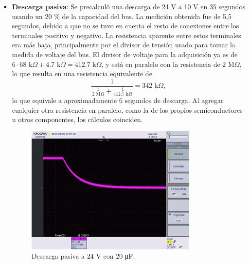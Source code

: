 \begin{itemize}
	\item \textbf{Descarga pasiva}: Se precalculó una descarga de 24 V a 10 V en 35 segundos usando un 20 \% de la capacidad del bus. La medición obtenida fue de 5,5 segundos, debido a que no se tuvo en cuenta el resto de conexiones entre los terminales positivo y negativo. La resistencia aparente entre estos terminales era más baja, principalmente por el divisor de tensión usado para tomar la medida de voltaje del bus. El divisor de voltaje para la adquisición ya es de $6 \cdot 68 \text{ k}\Omega + 4.7 \text{ k}\Omega = 412.7 \text{ k}\Omega$, y está en paralelo con la resistencia de $2 \text{ M}\Omega$, lo que resulta en una resistencia equivalente de 
	$$
	\frac{1}{\frac{1}{2 \text{ M}\Omega} + \frac{1}{412.7 \text{ k}\Omega}} = 342 \text{ k}\Omega,
	$$
	lo que equivale a aproximadamente 6 segundos de descarga. Al agregar cualquier otra resistencia en paralelo, como la de los propios semiconductores u otros componentes, los cálculos coinciden.
	
	\begin{figure}[H]
		\centering
		\includegraphics[width=0.7\linewidth]{fig/discharge1}
		\caption{Descarga pasiva a 24 V con 20 \unit{\micro\farad}.}
	\end{figure}
	

\end{itemize}
